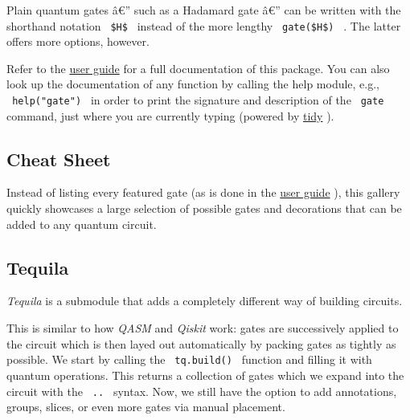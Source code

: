 Plain quantum gates â€'' such as a Hadamard gate â€'' can be written
with the shorthand notation \texttt{\ \$H\$\ } instead of the more
lengthy \texttt{\ gate(\$H\$)\ } . The latter offers more options,
however.

Refer to the
\href{https://github.com/Mc-Zen/quill/releases/download/v0.5.0/quill-guide.pdf}{user
guide} for a full documentation of this package. You can also look up
the documentation of any function by calling the help module, e.g.,
\texttt{\ help("gate")\ } in order to print the signature and
description of the \texttt{\ gate\ } command, just where you are
currently typing (powered by \href{https://github.com/Mc-Zen/tidy}{tidy}
).

\subsection{Cheat Sheet}\label{cheat-sheet}

Instead of listing every featured gate (as is done in the
\href{https://github.com/Mc-Zen/quill/releases/download/v0.5.0/quill-guide.pdf}{user
guide} ), this gallery quickly showcases a large selection of possible
gates and decorations that can be added to any quantum circuit.


\subsection{Tequila}\label{tequila}

\emph{Tequila} is a submodule that adds a completely different way of
building circuits.

\begin{Shaded}
\begin{Highlighting}[]

\NormalTok{  ),}
\NormalTok{)}
\end{Highlighting}
\end{Shaded}

This is similar to how \emph{QASM} and \emph{Qiskit} work: gates are
successively applied to the circuit which is then layed out
automatically by packing gates as tightly as possible. We start by
calling the \texttt{\ tq.build()\ } function and filling it with quantum
operations. This returns a collection of gates which we expand into the
circuit with the \texttt{\ ..\ } syntax. Now, we still have the option
to add annotations, groups, slices, or even more gates via manual
placement.

